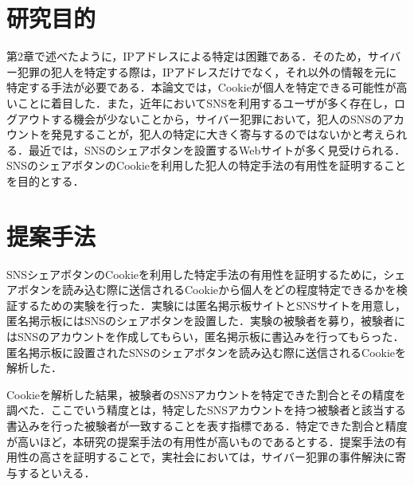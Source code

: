 \documentclass[10pt, a4paper]{jreport}
\begin{document}
\section{研究目的}

第2章で述べたように，IPアドレスによる特定は困難である．そのため，サイバー犯罪の犯人を特定する際は，IPアドレスだけでなく，それ以外の情報を元に特定する手法が必要である．本論文では，Cookieが個人を特定できる可能性が高いことに着目した．また，近年においてSNSを利用するユーザが多く存在し，ログアウトする機会が少ないことから，サイバー犯罪において，犯人のSNSのアカウントを発見することが，犯人の特定に大きく寄与するのではないかと考えられる．最近では，SNSのシェアボタンを設置するWebサイトが多く見受けられる．SNSのシェアボタンのCookieを利用した犯人の特定手法の有用性を証明することを目的とする．

\section{提案手法}
SNSシェアボタンのCookieを利用した特定手法の有用性を証明するために，シェアボタンを読み込む際に送信されるCookieから個人をどの程度特定できるかを検証するための実験を行った．実験には匿名掲示板サイトとSNSサイトを用意し，匿名掲示板にはSNSのシェアボタンを設置した．実験の被験者を募り，被験者にはSNSのアカウントを作成してもらい，匿名掲示板に書込みを行ってもらった．匿名掲示板に設置されたSNSのシェアボタンを読み込む際に送信されるCookieを解析した．

Cookieを解析した結果，被験者のSNSアカウントを特定できた割合とその精度を調べた．ここでいう精度とは，特定したSNSアカウントを持つ被験者と該当する書込みを行った被験者が一致することを表す指標である．特定できた割合と精度が高いほど，本研究の提案手法の有用性が高いものであるとする．提案手法の有用性の高さを証明することで，実社会においては，サイバー犯罪の事件解決に寄与するといえる．

\end{document}
